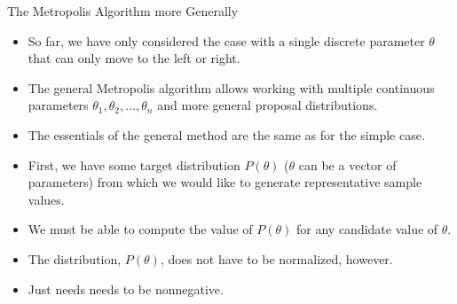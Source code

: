 \documentclass[handout]{beamer}
\begin{document}
\begin{frame}{The Metropolis Algorithm more Generally}
\scriptsize{

\begin{itemize}
\item So far, we have only considered the case with a single discrete parameter $\theta$ that can only move to the left or right.

\item The general Metropolis algorithm allows working with multiple continuous parameters $\theta_1,\theta_2,\dots,\theta_n$ and more general proposal distributions.  


\item The essentials of the general method are the same as for the simple case. 

\item First, we have some target distribution $P(\theta)$ ($\theta$ can be a vector of parameters) from which we would like to generate representative sample values. 

\item We must be able to compute the value of $P(\theta)$ for any candidate value of $\theta$. 
\item The distribution, $P(\theta)$, does not have to be normalized, however. 

\item Just needs needs to be nonnegative. 


\end{itemize}


} 
\end{frame}
\end{document}
